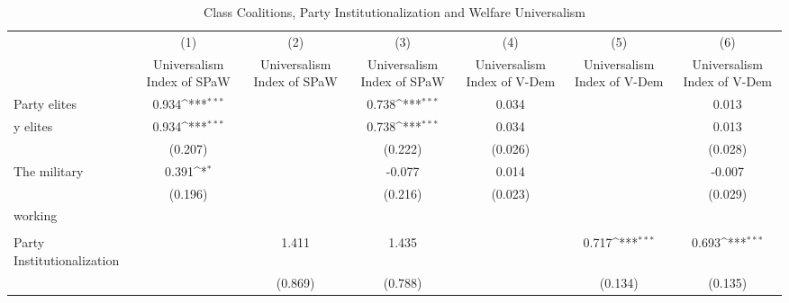\begin{table}[htbp]\centering
\def\sym#1{\ifmmode^{#1}\else\(^{#1}\)\fi}
\caption{Class Coalitions, Party Institutionalization and Welfare Universalism}
\begin{tabular}{l*{6}{c}}
\hline\hline
                    &\multicolumn{1}{c}{(1)}         &\multicolumn{1}{c}{(2)}         &\multicolumn{1}{c}{(3)}         &\multicolumn{1}{c}{(4)}         &\multicolumn{1}{c}{(5)}         &\multicolumn{1}{c}{(6)}         \\
                    &Universalism Index of SPaW         &Universalism Index of SPaW         &Universalism Index of SPaW         &Universalism Index of V-Dem         &Universalism Index of V-Dem         &Universalism Index of V-Dem         \\
\hline
Party elites        &       0.934\sym{***}&                     &       0.738\sym{***}&       0.034         &                     &       0.013         \\y elites        &       0.934\sym{***}&                     &       0.738\sym{***}&       0.034         &                     &       0.013         \\
                    &     (0.207)         &                     &     (0.222)         &     (0.026)         &                     &     (0.028)         \\
[1em]
The military        &       0.391\sym{*}  &                     &      -0.077         &       0.014         &                     &      -0.007         \\
                    &     (0.196)         &                     &     (0.216)         &     (0.023)         &                     &     (0.029)         \\
[1em]
working             &                     &                     &                     &                     &                     &                     \\
                    &                     &                     &                     &                     &                     &                     \\
[1em]
Party Institutionalization&                     &       1.411         &       1.435         &                     &       0.717\sym{***}&       0.693\sym{***}\\
                    &                     &     (0.869)         &     (0.788)         &                     &     (0.134)         &     (0.135)         \\
[1em]

\end{tabular}
\end{table}

